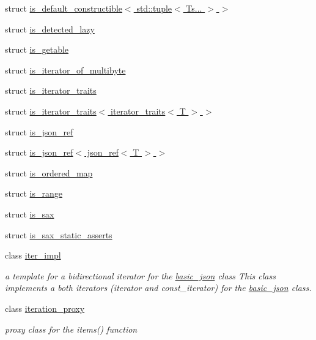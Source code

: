 \begin{DoxyCompactItemize}
\item 
struct \hyperlink{structnlohmann_1_1detail_1_1is__default__constructible_3_01std_1_1tuple_3_01Ts_8_8_8_01_4_01_4}{is\+\_\+default\+\_\+constructible$<$ std\+::tuple$<$ Ts... $>$ $>$}
\item 
struct \hyperlink{structnlohmann_1_1detail_1_1is__detected__lazy}{is\+\_\+detected\+\_\+lazy}
\item 
struct \hyperlink{structnlohmann_1_1detail_1_1is__getable}{is\+\_\+getable}
\item 
struct \hyperlink{structnlohmann_1_1detail_1_1is__iterator__of__multibyte}{is\+\_\+iterator\+\_\+of\+\_\+multibyte}
\item 
struct \hyperlink{structnlohmann_1_1detail_1_1is__iterator__traits}{is\+\_\+iterator\+\_\+traits}
\item 
struct \hyperlink{structnlohmann_1_1detail_1_1is__iterator__traits_3_01iterator__traits_3_01T_01_4_01_4}{is\+\_\+iterator\+\_\+traits$<$ iterator\+\_\+traits$<$ T $>$ $>$}
\item 
struct \hyperlink{structnlohmann_1_1detail_1_1is__json__ref}{is\+\_\+json\+\_\+ref}
\item 
struct \hyperlink{structnlohmann_1_1detail_1_1is__json__ref_3_01json__ref_3_01T_01_4_01_4}{is\+\_\+json\+\_\+ref$<$ json\+\_\+ref$<$ T $>$ $>$}
\item 
struct \hyperlink{structnlohmann_1_1detail_1_1is__ordered__map}{is\+\_\+ordered\+\_\+map}
\item 
struct \hyperlink{structnlohmann_1_1detail_1_1is__range}{is\+\_\+range}
\item 
struct \hyperlink{structnlohmann_1_1detail_1_1is__sax}{is\+\_\+sax}
\item 
struct \hyperlink{structnlohmann_1_1detail_1_1is__sax__static__asserts}{is\+\_\+sax\+\_\+static\+\_\+asserts}
\item 
class \hyperlink{classnlohmann_1_1detail_1_1iter__impl}{iter\+\_\+impl}
\begin{DoxyCompactList}\small\item\em a template for a bidirectional iterator for the \hyperlink{classnlohmann_1_1basic__json}{basic\+\_\+json} class This class implements a both iterators (iterator and const\+\_\+iterator) for the \hyperlink{classnlohmann_1_1basic__json}{basic\+\_\+json} class. \end{DoxyCompactList}\item 
class \hyperlink{classnlohmann_1_1detail_1_1iteration__proxy}{iteration\+\_\+proxy}
\begin{DoxyCompactList}\small\item\em proxy class for the items() function \end{DoxyCompactList}\item 

\end{DoxyCompactItemize}
